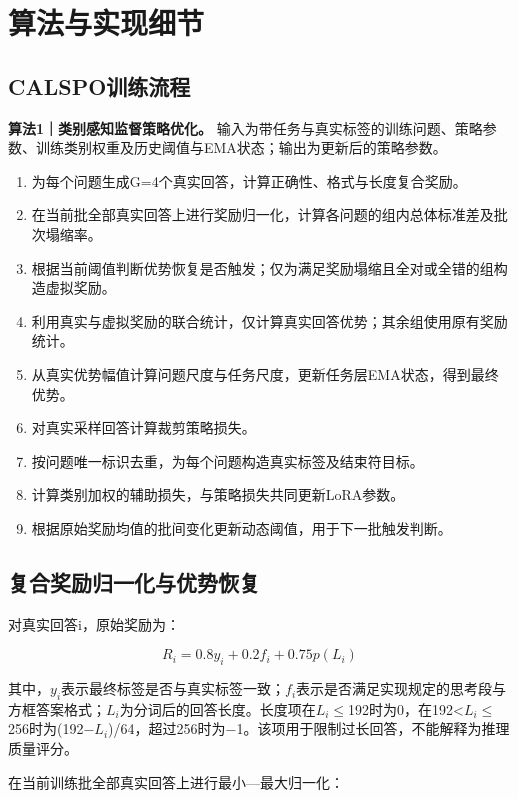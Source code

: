 \documentclass[UTF8,a4paper,11pt,fontset=windows]{ctexart}
\begin{document}
\section{算法与实现细节}

\subsection{CALSPO训练流程}

\textbf{算法1｜类别感知监督策略优化。} 输入为带任务与真实标签的训练问题、策略参数、训练类别权重及历史阈值与EMA状态；输出为更新后的策略参数。

\begin{enumerate}
\item 为每个问题生成G=4个真实回答，计算正确性、格式与长度复合奖励。
\item 在当前批全部真实回答上进行奖励归一化，计算各问题的组内总体标准差及批次塌缩率。
\item 根据当前阈值判断优势恢复是否触发；仅为满足奖励塌缩且全对或全错的组构造虚拟奖励。
\item 利用真实与虚拟奖励的联合统计，仅计算真实回答优势；其余组使用原有奖励统计。
\item 从真实优势幅值计算问题尺度与任务尺度，更新任务层EMA状态，得到最终优势。
\item 对真实采样回答计算裁剪策略损失。
\item 按问题唯一标识去重，为每个问题构造真实标签及结束符目标。
\item 计算类别加权的辅助损失，与策略损失共同更新LoRA参数。
\item 根据原始奖励均值的批间变化更新动态阈值，用于下一批触发判断。
\end{enumerate}

\subsection{复合奖励归一化与优势恢复}

对真实回答i，原始奖励为：

\begin{equation*}
R_i=0.8y_i+0.2f_i+0.75p(L_i)
\end{equation*}

其中，$y_i$表示最终标签是否与真实标签一致；$f_i$表示是否满足实现规定的思考段与方框答案格式；$L_i$为分词后的回答长度。长度项在$L_i$$\le$192时为0，在192<$L_i$$\le$256时为(192$-$$L_i$)/64，超过256时为$-$1。该项用于限制过长回答，不能解释为推理质量评分。

在当前训练批全部真实回答上进行最小—最大归一化：
\end{document}
